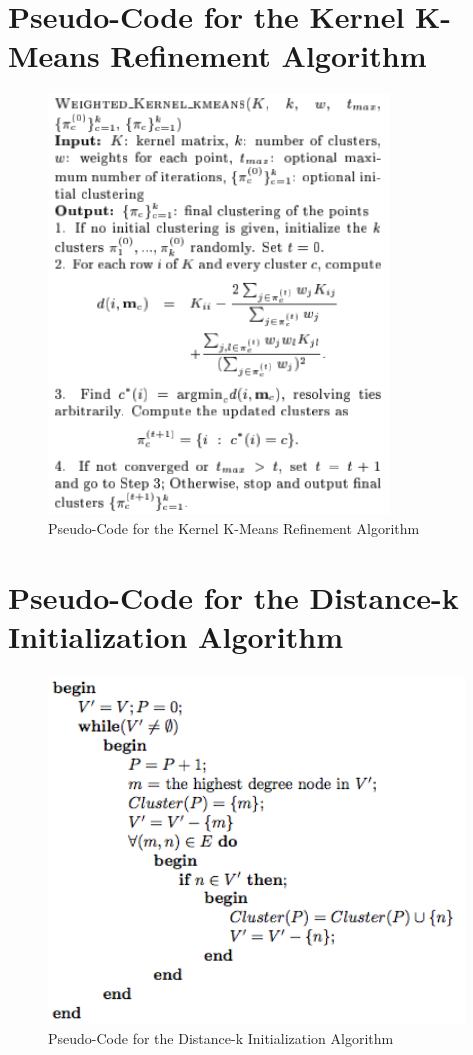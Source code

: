 \documentclass[12pt]{article}
\begin{document}
\newpage
\section{Pseudo-Code for the Kernel K-Means Refinement Algorithm}
\label{appendix:kernel_kmeans}
\begin{figure}[!htb]
\begin{center}
	\includegraphics[height=30em]{kernel_kmeans.png}
	\caption{Pseudo-Code for the Kernel K-Means Refinement Algorithm}
\end{center}
\end{figure}

\newpage
\section{Pseudo-Code for the Distance-k Initialization Algorithm}
\label{appendix:distk_init}
\begin{figure}[!htb]
\begin{center}
	\includegraphics[height=25em]{distk_init}
	\caption{Pseudo-Code for the Distance-k Initialization Algorithm}
\end{center}
\end{figure}
\end{document}
